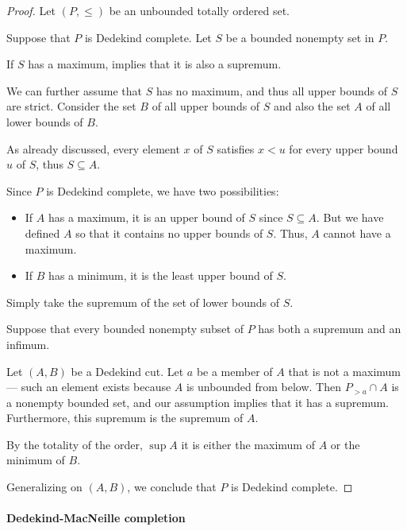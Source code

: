 \begin{proof}
  Let \( (P, \leq) \) be an unbounded totally ordered set.

  \SufficiencySubProof Suppose that \( P \) is Dedekind complete. Let \( S \) be a bounded nonempty set in \( P \).

   If \( S \) has a maximum,  implies that it is also a supremum.

  We can further assume that \( S \) has no maximum, and thus all upper bounds of \( S \) are strict. Consider the set \( B \) of all upper bounds of \( S \) and also the set \( A \) of all  lower bounds of \( B \).

  As already discussed, every element \( x \) of \( S \) satisfies \( x < u \) for every upper bound \( u \) of \( S \), thus \( S \subseteq A \).

  Since \( P \) is Dedekind complete, we have two possibilities:
  \begin{itemize}
    \item If \( A \) has a maximum, it is an upper bound of \( S \) since \( S \subseteq A \). But we have defined \( A \) so that it contains no upper bounds of \( S \). Thus, \( A \) cannot have a maximum.

    \item If \( B \) has a minimum, it is the least upper bound of \( S \).
  \end{itemize}

   Simply take the supremum of the set of lower bounds of \( S \).

  \NecessitySubProof Suppose that every bounded nonempty subset of \( P \) has both a supremum and an infimum.

  Let \( (A, B) \) be a Dedekind cut. Let \( a \) be a member of \( A \) that is not a maximum --- such an element exists because \( A \) is unbounded from below. Then \( P_{>a} \cap A \) is a nonempty bounded set, and our assumption implies that it has a supremum. Furthermore, this supremum is the supremum of \( A \).

  By the totality of the order, \( \sup A \) it is either the maximum of \( A \) or the minimum of \( B \).

  Generalizing on \( (A, B) \), we conclude that \( P \) is Dedekind complete.
\end{proof}

\paragraph{Dedekind-MacNeille completion}


